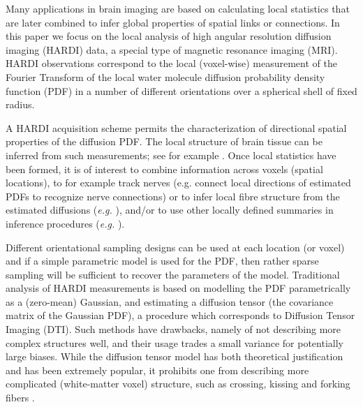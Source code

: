 \documentclass[dvips,aoas,preprint]{imsart}
\numberwithin{equation}{section}
\theoremstyle{plain}
\begin{document}
Many applications in brain imaging are based on calculating local statistics that are later combined
to infer global properties of spatial links or connections. In this paper we focus on the local analysis of high
angular resolution diffusion imaging (HARDI) data, a special type of magnetic resonance imaging (MRI). HARDI observations correspond to the local (voxel-wise) measurement of the Fourier Transform of the local water molecule diffusion probability density function (PDF) \citep{Callaghan} in a number of different orientations over a spherical shell of fixed radius.

A HARDI acquisition scheme  permits the characterization of directional spatial
properties of the diffusion PDF. The local structure of brain tissue can be  inferred from such measurements; see for example \cite{basser1994,bas:relationships}. Once local statistics have been formed, it is of interest to combine information across voxels (spatial locations), to for example track nerves (e.g. connect local directions of estimated PDFs to recognize nerve connections) or to infer local fibre structure from the estimated diffusions
({\em e.g.} \cite{mor-zij:fiber-tracking}),
and/or to use other locally defined summaries in inference procedures ({\em e.g.} \cite{jen-etal:kurtosis}). 

Different orientational sampling designs can be used at each location (or voxel) and if a simple parametric model is used for the PDF, then rather sparse sampling will be sufficient to recover the parameters of the model. Traditional analysis of HARDI measurements is based
on modelling the PDF parametrically as a (zero-mean) Gaussian, and estimating a
diffusion tensor (the covariance matrix of the Gaussian PDF), a procedure which corresponds to Diffusion Tensor Imaging (DTI). Such methods have drawbacks, namely of not describing more complex structures well, and their usage trades a small variance for potentially large biases. While the diffusion tensor model has both
theoretical justification and has been extremely popular, it prohibits
one from describing more complicated (white-matter voxel) structure,
such as crossing, kissing and forking fibers
\citep{mor-zij:fiber-tracking}.  
\end{document}
